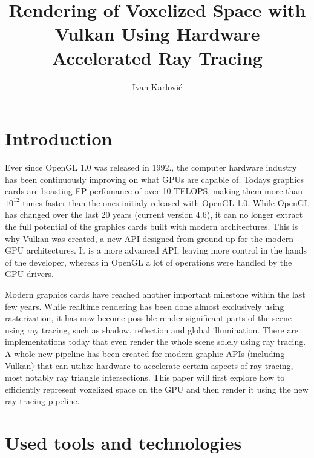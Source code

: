 \documentclass[times, utf8, zavrsni]{fer}
\begin{document}

\title{Rendering of Voxelized Space with Vulkan Using Hardware Accelerated Ray Tracing}

\author{Ivan Karlović}

\maketitle

\izvornik

\zahvala{}

\tableofcontents

\chapter{Introduction}
Ever since OpenGL 1.0 was released in 1992., the computer hardware industry has been continuously improving on what GPUs are capable of. Todays graphics cards are boasting FP perfomance of over 10 TFLOPS, making them more than $10^{12}$ times faster than the ones initialy released with OpenGL 1.0. While OpenGL has changed over the last 20 years (current version 4.6), it can no longer extract the full potential of the graphics cards built with modern architectures. This is why Vulkan was created, a new API designed from ground up for the modern GPU architectures. It is a more advanced API, leaving more control in the hands of the developer, whereas in OpenGL a lot of operations were handled by the GPU drivers.

Modern graphics cards have reached another important milestone within the last few years. While realtime rendering has been done almost exclusively using rasterization, it has now become possible render significant parts of the scene using ray tracing, such as shadow, reflection and global illumination. There are implementations today that even render the whole scene solely using ray tracing. A whole new pipeline has been created for modern graphic APIs (including Vulkan) that can utilize hardware to accelerate certain aspects of ray tracing, most notably ray triangle intersections. This paper will first explore how to efficiently represent voxelized space on the GPU and then render it using the new ray tracing pipeline.

\chapter{Used tools and technologies}
\end{document}
